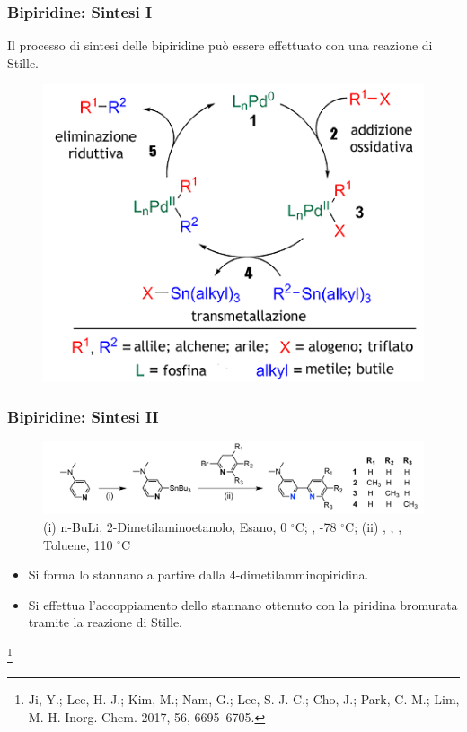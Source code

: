 \documentclass[9pt]{beamer}
\newcommand\blfootnote[1]{%
	\begingroup
	\renewcommand\thefootnote{}\footnote{#1}%
	\addtocounter{footnote}{-1}%
	\endgroup
}
\begin{document}
\begin{frame}
	\frametitle{Bipiridine: Sintesi I}
	Il processo di sintesi delle bipiridine può essere effettuato con una reazione di Stille.

	\begin{figure}
		\includegraphics[scale=0.7]{immagini/stille.png}
	\end{figure}

\end{frame}

\begin{frame}
	\frametitle{Bipiridine: Sintesi II}
	\begin{figure}
		\includegraphics[width=\textwidth]{immagini/rea_g.png}
		{\caption*{\footnotesize{(i) n-BuLi, 2-Dimetilaminoetanolo, Esano, 0 $^\circ$C; , -78 $^\circ$C; (ii) , , , Toluene, 110 $^\circ$C}}}
	\end{figure}
	\begin{itemize}
		\item Si forma lo stannano a partire dalla 4-dimetilamminopiridina.
		\item Si effettua l'accoppiamento dello stannano ottenuto con la piridina bromurata tramite la reazione di Stille.
	\end{itemize}

	\blfootnote{Ji, Y.; Lee, H. J.; Kim, M.; Nam, G.; Lee, S. J. C.; Cho, J.; Park, C.-M.; Lim, M. H. Inorg. Chem. 2017,
		56, 6695–6705.}
\end{frame}
\end{document}
